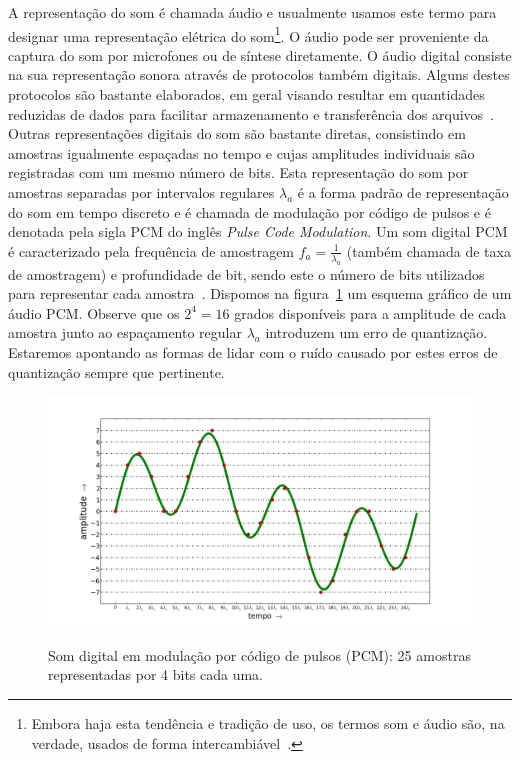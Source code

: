 A representação do som é chamada áudio e usualmente usamos este termo para designar uma representação elétrica do som\footnote{Embora haja esta tendência e tradição de uso, os termos
som e áudio são, na verdade, usados de forma intercambiável~\cite{Everest}.}. O áudio pode ser proveniente da captura do som por microfones ou de síntese diretamente. O áudio digital consiste na sua representação sonora através de protocolos também digitais. Alguns destes protocolos são bastante elaborados, em geral visando resultar em quantidades reduzidas de dados para facilitar armazenamento e transferência dos arquivos~\cite{procFala}. Outras representações digitais do som são bastante diretas, consistindo em amostras igualmente espaçadas no tempo e cujas amplitudes individuais são registradas com um mesmo número de bits. Esta representação do som por amostras separadas por intervalos regulares $\lambda_a$ é a forma padrão de representação do som em tempo discreto e é chamada de modulação por código de pulsos e é denotada pela sigla PCM do inglês \emph{Pulse Code Modulation}.
Um som digital PCM é caracterizado pela frequência de amostragem $f_a=\frac{1}{\lambda_a}$ (também chamada de taxa de amostragem) e profundidade de bit, sendo este o número de bits utilizados para representar cada amostra~\cite{protocolosAudio}. Dispomos na figura~\ref{fig:PCM} um esquema gráfico de um áudio PCM. Observe que os $2^4=16$ grados disponíveis para a amplitude de cada amostra junto ao espaçamento regular $\lambda_a$ introduzem um erro de quantização. Estaremos apontando as formas de lidar com o ruído causado por estes erros de quantização sempre que pertinente.


\begin{figure}[h!]
    \centering
    \caption{Som digital em modulação por código de pulsos (PCM): 25 amostras representadas por 4 bits cada uma.}
        \includegraphics[width=\textwidth]{figuras/pcm}
        \label{fig:PCM}
\end{figure}

